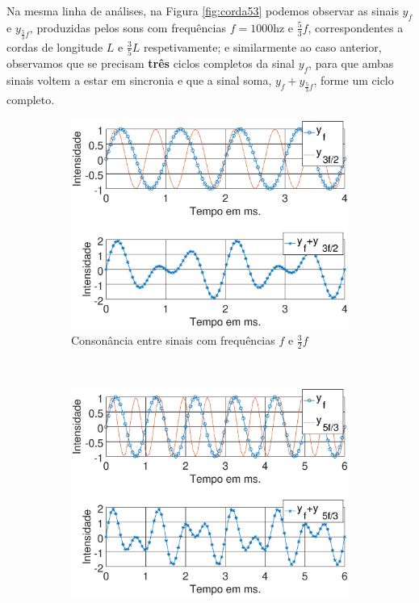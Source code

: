Na mesma linha de análises, na Figura \ref{fig:corda53} podemos observar as sinais $y_{f}$ e $y_{\frac{5}{3}f}$, 
produzidas pelos sons com frequências $f=1000$hz e $\frac{5}{3}f$,
correspondentes a cordas de longitude $L$ e $\frac{3}{5}L$ respetivamente;
e similarmente ao caso anterior, observamos que se precisam \textbf{três} ciclos completos da sinal $y_{f}$,
para que ambas sinais voltem a estar em sincronia e que a sinal soma, $y_{f}+y_{\frac{5}{3}f}$, forme um ciclo completo.

\begin{figure}
    \centering
    \begin{subfigure}[b]{0.8\textwidth}
        \includegraphics[width=\textwidth]{chapters/cap-musica-composer/consonancia32.eps}
        \caption{Consonância entre sinais com frequências $f$ e $\frac{3}{2}f$}
        \label{fig:corda32}
    \end{subfigure}
    ~ %
    \begin{subfigure}[b]{0.8\textwidth}
        \includegraphics[width=\textwidth]{chapters/cap-musica-composer/consonancia53.eps}

\end{subfigure}
\end{figure}
